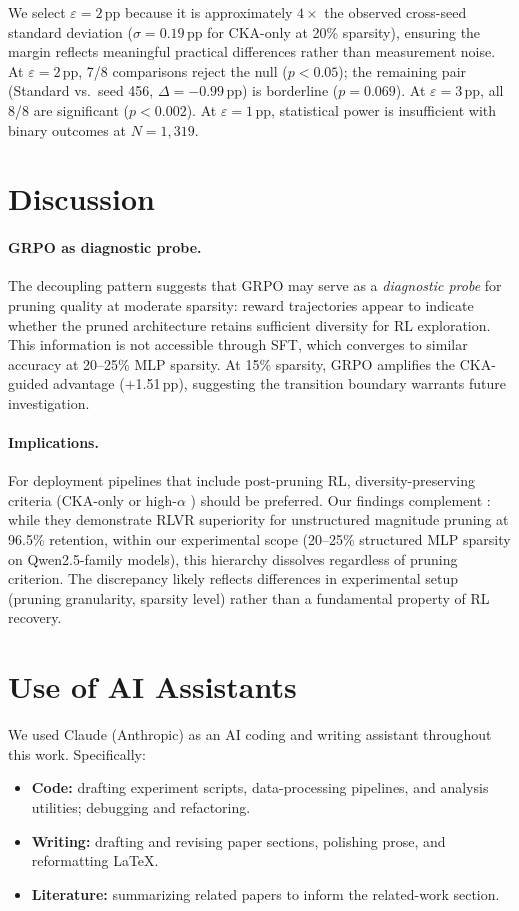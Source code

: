 We select $\varepsilon{=}2$\,pp because it is approximately $4\times$ the observed cross-seed standard deviation ($\sigma{=}0.19$\,pp for CKA-only at 20\% sparsity), ensuring the margin reflects meaningful practical differences rather than measurement noise.
At $\varepsilon{=}2$\,pp, 7/8 comparisons reject the null ($p{<}0.05$); the remaining pair (Standard vs.\ seed 456, $\Delta{=}{-}0.99$\,pp) is borderline ($p{=}0.069$).
At $\varepsilon{=}3$\,pp, all 8/8 are significant ($p{<}0.002$).
At $\varepsilon{=}1$\,pp, statistical power is insufficient with binary outcomes at $N{=}1{,}319$.

\section{Discussion}
\label{sec:appendix_discussion}

\paragraph{GRPO as diagnostic probe.}
The decoupling pattern suggests that GRPO may serve as a \emph{diagnostic probe} for pruning quality at moderate sparsity: reward trajectories appear to indicate whether the pruned architecture retains sufficient diversity for RL exploration. This information is not accessible through SFT, which converges to similar accuracy at 20--25\% MLP sparsity.
At 15\% sparsity, GRPO amplifies the CKA-guided advantage ($+$1.51\,pp), suggesting the transition boundary warrants future investigation.

\paragraph{Implications.}
For deployment pipelines that include post-pruning RL, diversity-preserving criteria (CKA-only or high-$\alpha$ \rasp{}) should be preferred.
Our findings complement \citet{selfhealing2025}: while they demonstrate RLVR superiority for unstructured magnitude pruning at 96.5\% retention, within our experimental scope (20--25\% structured MLP sparsity on Qwen2.5-family models), this hierarchy dissolves regardless of pruning criterion. The discrepancy likely reflects differences in experimental setup (pruning granularity, sparsity level) rather than a fundamental property of RL recovery.

\section{Use of AI Assistants}
\label{sec:appendix_ai_assistants}

We used Claude (Anthropic) as an AI coding and writing assistant throughout this work. Specifically:
\begin{itemize}[nosep,leftmargin=*]
    \item \textbf{Code:} drafting experiment scripts, data-processing pipelines, and analysis utilities; debugging and refactoring.
    \item \textbf{Writing:} drafting and revising paper sections, polishing prose, and reformatting \LaTeX{}.
    \item \textbf{Literature:} summarizing related papers to inform the related-work section.
\end{itemize}
